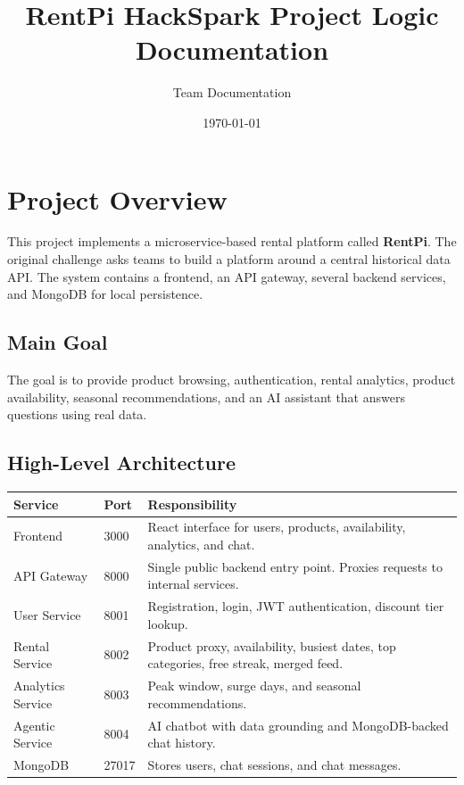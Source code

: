 \documentclass[11pt,a4paper]{article}
\title{\textbf{RentPi HackSpark Project Logic Documentation}}
\author{Team Documentation}
\date{\today}
\begin{document}
\maketitle
\tableofcontents
\newpage

\section{Project Overview}

This project implements a microservice-based rental platform called \textbf{RentPi}. The original challenge asks teams to build a platform around a central historical data API. The system contains a frontend, an API gateway, several backend services, and MongoDB for local persistence.

\subsection{Main Goal}

The goal is to provide product browsing, authentication, rental analytics, product availability, seasonal recommendations, and an AI assistant that answers questions using real data.

\subsection{High-Level Architecture}

\begin{center}
\begin{tabular}{|p{3.2cm}|p{2cm}|p{8cm}|}
\hline
\textbf{Service} & \textbf{Port} & \textbf{Responsibility} \\
\hline
Frontend & 3000 & React interface for users, products, availability, analytics, and chat. \\
\hline
API Gateway & 8000 & Single public backend entry point. Proxies requests to internal services. \\
\hline
User Service & 8001 & Registration, login, JWT authentication, discount tier lookup. \\
\hline
Rental Service & 8002 & Product proxy, availability, busiest dates, top categories, free streak, merged feed. \\
\hline
Analytics Service & 8003 & Peak window, surge days, and seasonal recommendations. \\
\hline
Agentic Service & 8004 & AI chatbot with data grounding and MongoDB-backed chat history. \\
\hline
MongoDB & 27017 & Stores users, chat sessions, and chat messages. \\
\hline
\end{tabular}
\end{center}
\end{document}
